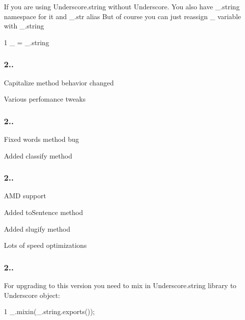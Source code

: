 If you are using Underscore.\+string without Underscore. You also have {\ttfamily \+\_\+.\+string} namespace for it and {\ttfamily \+\_\+.\+str} alias But of course you can just reassign {\ttfamily \+\_\+} variable with {\ttfamily \+\_\+.\+string}


\begin{DoxyCode}
1 \_ = \_.string
\end{DoxyCode}
 \subsubsection*{2..}


\begin{DoxyItemize}
\item Capitalize method behavior changed
\item Various perfomance tweaks
\end{DoxyItemize}

\subsubsection*{2..}


\begin{DoxyItemize}
\item Fixed words method bug
\item Added classify method
\end{DoxyItemize}

\subsubsection*{2..}


\begin{DoxyItemize}
\item A\+M\+D support
\item Added to\+Sentence method
\item Added slugify method
\item Lots of speed optimizations
\end{DoxyItemize}

\subsubsection*{2..}

For upgrading to this version you need to mix in Underscore.\+string library to Underscore object\+:


\begin{DoxyCode}
1 \_.mixin(\_.string.exports());
\end{DoxyCode}


